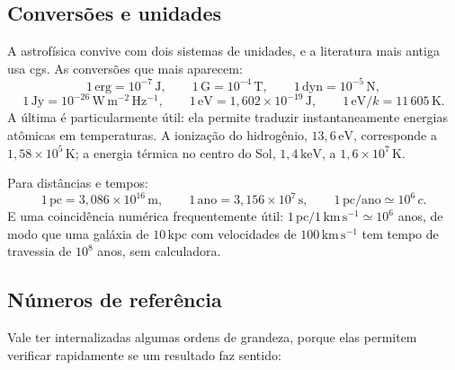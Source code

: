 \documentclass[11pt,a4paper]{article}
\begin{document}
\subsection*{Conversões e unidades}

A astrofísica convive com dois sistemas de unidades, e a literatura mais antiga usa cgs. As conversões que mais aparecem:
\[
1\,\mathrm{erg}=10^{-7}\,\mathrm{J},
\qquad
1\,\mathrm{G}=10^{-4}\,\mathrm{T},
\qquad
1\,\mathrm{dyn}=10^{-5}\,\mathrm{N},
\]
\[
1\,\mathrm{Jy}=10^{-26}\,\mathrm{W\,m^{-2}\,Hz^{-1}},
\qquad
1\,\mathrm{eV}=1{,}602\times10^{-19}\,\mathrm{J},
\qquad
1\,\mathrm{eV}/k=11\,605\,\mathrm{K}.
\]
A última é particularmente útil: ela permite traduzir instantaneamente energias atômicas em temperaturas. A ionização do hidrogênio, $13{,}6\,\mathrm{eV}$, corresponde a $1{,}58\times10^{5}\,\mathrm{K}$; a energia térmica no centro do Sol, $1{,}4\,\mathrm{keV}$, a $1{,}6\times10^{7}\,\mathrm{K}$.

Para distâncias e tempos:
\[
1\,\mathrm{pc}=3{,}086\times10^{16}\,\mathrm{m},
\qquad
1\,\mathrm{ano}=3{,}156\times10^{7}\,\mathrm{s},
\qquad
1\,\mathrm{pc/ano}\simeq10^{6}\,c.
\]
E uma coincidência numérica frequentemente útil: $1\,\mathrm{pc}/1\,\mathrm{km\,s^{-1}}\simeq10^{6}$ anos, de modo que uma galáxia de $10\,\mathrm{kpc}$ com velocidades de $100\,\mathrm{km\,s^{-1}}$ tem tempo de travessia de $10^{8}$ anos, sem calculadora.

\subsection*{Números de referência}

Vale ter internalizadas algumas ordens de grandeza, porque elas permitem verificar rapidamente se um resultado faz sentido:
\end{document}
